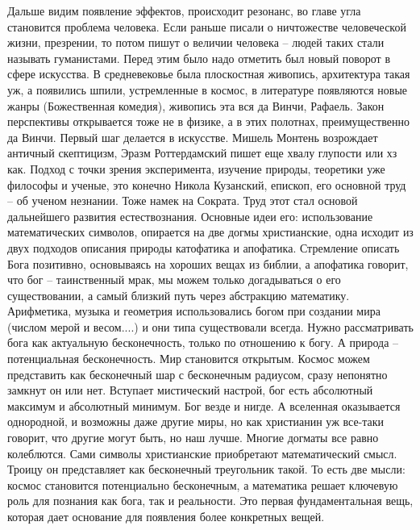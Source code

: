 \documentclass[a4paper, 12pt]{article}
\begin{document}
Дальше видим появление эффектов, происходит резонанс, во главе угла 
становится проблема человека. Если раньше писали о ничтожестве 
человеческой жизни, презрении, то потом пишут о величии человека -- 
людей таких стали называть гуманистами. Перед этим было надо отметить 
был новый поворот в сфере искусства. В средневековье была плоскостная 
живопись, архитектура такая уж, а появились шпили, устремленные 
в космос, в литературе появляются новые жанры (Божественная комедия), 
живопись эта вся да Винчи, Рафаель. Закон перспективы открывается тоже 
не в физике, а в этих полотнах, преимущественно да Винчи. Первый шаг 
делается в искусстве. Мишель Монтень возрождает античный скептицизм, 
Эразм Роттердамский пишет еще хвалу глупости или хз как. Подход с точки 
зрения эксперимента, изучение природы, теоретики уже философы и ученые, 
это конечно Никола Кузанский, епископ, его основной труд -- об ученом 
незнании. Тоже намек на Сократа. Труд этот стал основой дальнейшего 
развития естествознания. Основные идеи его: использование математических 
символов, опирается на две догмы христианские, одна исходит из двух 
подходов описания природы катофатика и апофатика. Стремление описать 
Бога позитивно, основываясь на хороших вещах из библии, а апофатика 
говорит, что бог -- таинственный мрак, мы можем только догадываться 
о его существовании, а самый близкий путь через абстракцию математику. 
Арифметика, музыка и геометрия использовались богом при создании мира 
(числом мерой и весом....) и они типа существовали всегда. Нужно 
рассматривать бога как актуальную бесконечность, только по отношению 
к богу. А природа -- потенциальная бесконечность. Мир становится 
открытым. Космос можем представить как бесконечный шар с бесконечным 
радиусом, сразу непонятно замкнут он или нет. Вступает мистический 
настрой, бог есть абсолютный максимум и абсолютный минимум. Бог везде 
и нигде. А вселенная оказывается однородной, и возможны даже другие 
миры, но как христианин уж все-таки говорит, что другие могут быть, но 
наш лучше. Многие догматы все равно колеблются. Сами символы 
христианские приобретают математический смысл. Троицу он представляет 
как бесконечный треугольник такой. То есть две мысли: космос становится 
потенциально бесконечным, а математика решает ключевую роль для познания 
как бога, так и реальности. Это первая фундаментальная вещь, которая 
дает основание для появления более конкретных вещей.
\end{document}
